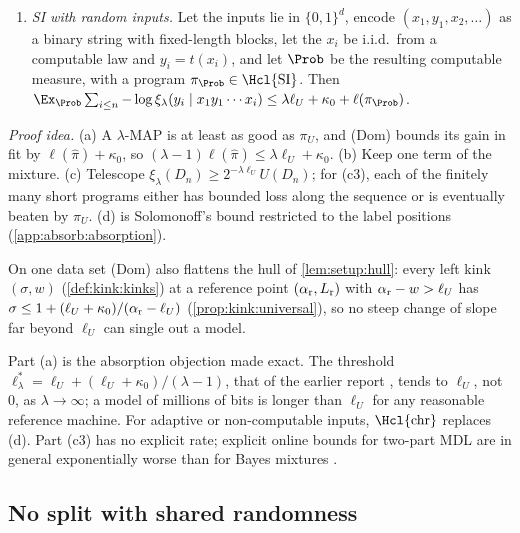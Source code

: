 \begin{theorem}[Absorption]
\begin{enumerate}[label=(\alph*),itemsep=0pt,topsep=2pt]
\begin{enumerate}[label=(c\arabic*),itemsep=0pt,topsep=0pt]
\end{enumerate}
With $\lambda=cn$, (c1) and (c3) are not available; (a) and (c2) hold at each $n$.
\item \emph{SI with random inputs.} Let the inputs lie in $\{0,1\}^d$, encode $(x_1,y_1,x_2,\dots)$ as a binary string with fixed-length blocks, let the $x_i$ be i.i.d.\ from a computable law and $y_i=t(x_i)$, and let $\Prob$ be the resulting computable measure, with a program $\pi_{\Prob}\in\Hcl{\mathrm{SI}}$. Then $\Ex_{\Prob}\sum_{i\le n}-\log\xi_\lambda(y_i\mid x_1y_1\cdots x_i)\le\lambda\ell_U+\kappa_0+\ell(\pi_{\Prob})$.
\end{enumerate}
\end{theorem}

\emph{Proof idea.} (a) A $\lambda$-MAP is at least as good as $\pi_U$, and (Dom) bounds its gain in fit by $\ell(\hat\pi)+\kappa_0$, so $(\lambda-1)\ell(\hat\pi)\le\lambda\ell_U+\kappa_0$. (b) Keep one term of the mixture. (c) Telescope $\xi_\lambda(D_n)\ge2^{-\lambda\ell_U}U(D_n)$; for (c3), each of the finitely many short programs either has bounded loss along the sequence or is eventually beaten by $\pi_U$. (d) is Solomonoff's bound \citep{solomonoff1978complexity} restricted to the label positions (\cref{app:absorb:absorption}).

On one data set (Dom) also flattens the hull of \cref{lem:setup:hull}: every left kink $(\sigma,w)$ (\cref{def:kink:kinks}) at a reference point $(\alpha_{\rm r},L_{\rm r})$ with $\alpha_{\rm r}-w>\ell_U$ has $\sigma\le1+(\ell_U+\kappa_0)/(\alpha_{\rm r}-\ell_U)$ (\cref{prop:kink:universal}), so no steep change of slope far beyond $\ell_U$ can single out a model.

\begin{remark}[Reading]\label{rem:absorb:reading}
Part (a) is the absorption objection made exact. The threshold $\ell^*_\lambda=\ell_U+(\ell_U+\kappa_0)/(\lambda-1)$, that of the earlier report \citep{claude2026whatfollows}, tends to $\ell_U$, not $0$, as $\lambda\to\infty$; a model of millions of bits is longer than $\ell_U$ for any reasonable reference machine. For adaptive or non-computable inputs, $\Hcl{\mathrm{chr}}$ replaces (d). Part (c3) has no explicit rate; explicit online bounds for two-part MDL are in general exponentially worse than for Bayes mixtures \citep{poland2005asymptotics}.
\end{remark}

\subsection{No split with shared randomness}\label{sec:split:shared}

